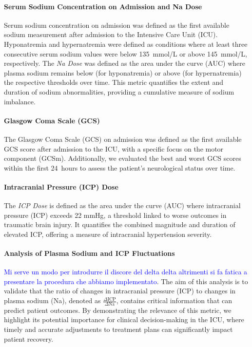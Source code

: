 \paragraph{Serum Sodium Concentration on Admission and Na Dose}

Serum sodium concentration on admission was defined as the first available sodium measurement after admission to the Intensive Care Unit (ICU). Hyponatremia and hypernatremia were defined as conditions where at least three consecutive serum sodium values were below 135~mmol/L or above 145~mmol/L, respectively. The \textit{Na Dose} was defined as the area under the curve (AUC) where plasma sodium remains below (for hyponatremia) or above (for hypernatremia) the respective thresholds over time. This metric quantifies the extent and duration of sodium abnormalities, providing a cumulative measure of sodium imbalance.

\paragraph{Glasgow Coma Scale (GCS)}

The Glasgow Coma Scale (GCS) on admission was defined as the first available GCS score after admission to the ICU, with a specific focus on the motor component (GCSm). Additionally, we evaluated the best and worst GCS scores within the first 24~hours to assess the patient's neurological status over time. 

\paragraph{Intracranial Pressure (ICP) Dose}
The \textit{ICP Dose} is defined as the area under the curve (AUC) where intracranial pressure (ICP) exceeds 22 mmHg, a threshold linked to worse outcomes in traumatic brain injury. It quantifies the combined magnitude and duration of elevated ICP, offering a measure of intracranial hypertension severity.


\paragraph{Analysis of Plasma Sodium and ICP Fluctuations}

\textcolor{blue}{Mi serve un modo per introdurre il discore del delta delta altrimenti si fa fatica a presentare la procedura che abbiamo implementato}.
The aim of this analysis is to validate that the ratio of changes in intracranial pressure (ICP) to changes in plasma sodium (Na), denoted as \(\frac{\Delta \text{ICP}}{\Delta \text{Na}}\), contains critical information that can predict patient outcomes. By demonstrating the relevance of this metric, we highlight its potential importance for clinical decision-making in the ICU, where timely and accurate adjustments to treatment plans can significantly impact patient recovery.

